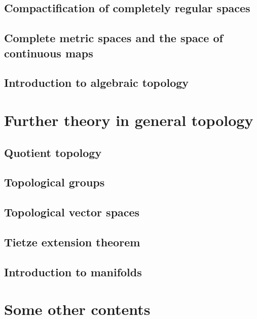 \chapter{Compactification of completely regular spaces}\label{compactification}
    
    
    

\chapter{Complete metric spaces and the space of continuous maps}\label{completeness and C0 spaces}
    
    
    
    

\chapter{Introduction to algebraic topology}\label{fundamental groups}
    
    
    
    




\part{Further theory in general topology}

\chapter{Quotient topology}\label{quotient topology}
    
    

\chapter{Topological groups}\label{topological groups}
    
    
    

\chapter{Topological vector spaces}\label{topological vector spaces}
    
    

\chapter{Tietze extension theorem}\label{Tietze extn thm}
    

\chapter{Introduction to manifolds}\label{introduction to manifolds}
    




\part{Some other contents}

